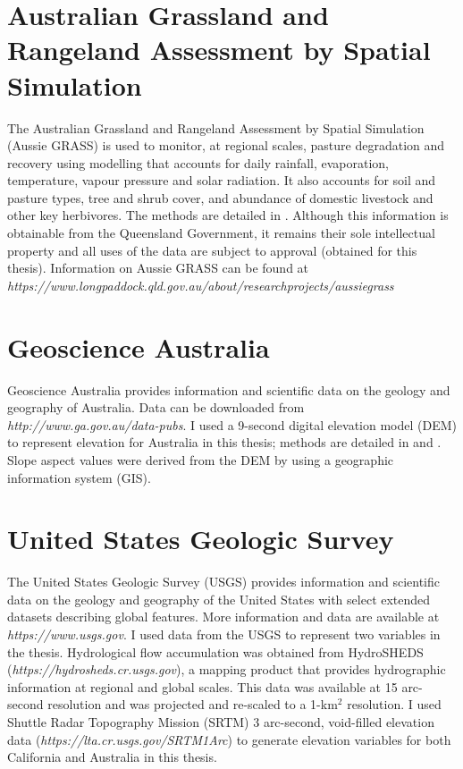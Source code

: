 \section{Australian Grassland and Rangeland Assessment by Spatial Simulation}

The Australian Grassland and Rangeland Assessment by Spatial Simulation (Aussie GRASS) is used to monitor, at regional scales, pasture degradation and recovery using modelling that accounts for daily rainfall, evaporation, temperature, vapour pressure and solar radiation. It also accounts for soil and pasture types, tree and shrub cover, and abundance of domestic livestock and other key herbivores. The methods are detailed in \cite{cart03}. Although this information is obtainable from the Queensland Government, it remains their sole intellectual property and all uses of the data are subject to approval (obtained for this thesis). Information on Aussie GRASS can be found at \textit{https://www.longpaddock.qld.gov.au/about/researchprojects/aussiegrass}

\section{Geoscience Australia}

Geoscience Australia provides information and scientific data on the geology and geography of Australia. Data can be downloaded from \textit{http://www.ga.gov.au/data-pubs}. I used a 9-second digital elevation model (DEM) to represent elevation for Australia in this thesis; methods are detailed in \cite{hutc91} and \cite{hutc11}. Slope aspect values were derived from the DEM by using a geographic information system (GIS).

\section{United States Geologic Survey}

The United States Geologic Survey (USGS) provides information and scientific data on the geology and geography of the United States with select extended datasets describing global features. More information and data are available at \textit{https://www.usgs.gov}. I used data from the USGS to represent two variables in the thesis. Hydrological flow accumulation was obtained from HydroSHEDS (\textit{https://hydrosheds.cr.usgs.gov}), a mapping product that provides hydrographic information at regional and global scales. This data was available at 15 arc-second resolution and was projected and re-scaled to a 1-km$^2$ resolution. I used Shuttle Radar Topography Mission (SRTM) 3 arc-second, void-filled elevation data (\textit{https://lta.cr.usgs.gov/SRTM1Arc}) to generate elevation variables for both California and Australia in this thesis.

